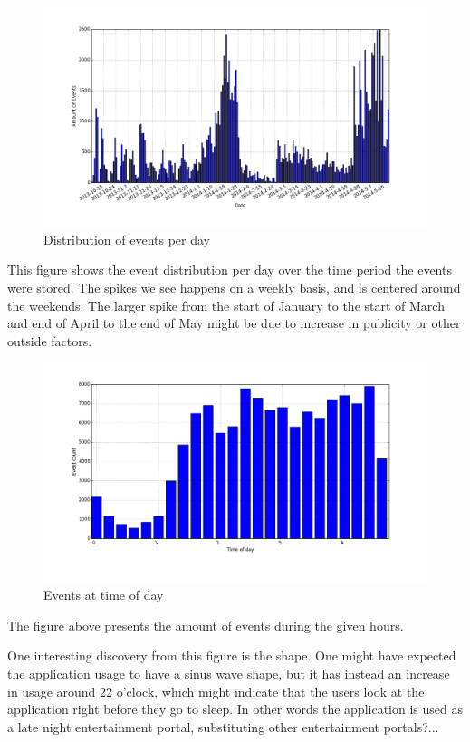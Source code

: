     \begin{figure}[H]
        \includegraphics[width=5in]{image/eventsPerDay.png}
        \centering
        \caption{Distribution of events per day}
    \label{figure:eventOnDaysDist}
    \end{figure}
        This figure shows the event distribution per day over the time period the events were stored.
        The spikes we see happens on a weekly basis, and is centered around the weekends.
        The larger spike from the start of January to the start of March and end of April to the end of May might be due to increase in publicity or other outside factors.


    \begin{figure}[H]
        \includegraphics[width=5in]{image/hrdistribution.png}
        \centering
        \caption{Events at time of day}
    \label{figure:timeOfDayDistr}
    \end{figure}
        The figure above presents the amount of events during the given hours.

        One interesting discovery from this figure is the shape. One might have expected the application usage to have a sinus wave shape, but it has instead an increase in usage around 22 o'clock, which might indicate that the users look at the application right before they go to sleep. In other words the application is used as a late night entertainment portal, substituting other entertainment portals?... 


